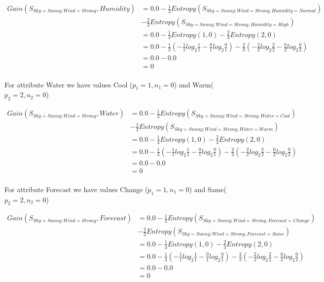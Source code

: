 \documentclass[10pt,a4paper]{article}
\begin{document}
{{{{{{{{{{\begin{equation}
\begin{split}
Gain(S_{Sky=Sunny;Wind=Strong},Humidity) &= 0.0 - \frac{1}{3} Entropy(S_{Sky=Sunny;Wind=Strong,Humidity=Normal} ) \\ &- \frac{2}{3}Entropy(S_{Sky=Sunny;Wind=Strong,Humidity=High}) \\
          &= 0.0 - \frac{1}{3} Entropy(1,0) - \frac{2}{3}Entropy(2,0) \\
          &= 0.0 -\frac{1}{3} ( -\frac{1}{1} log_2\frac{1}{1} -\frac{0}{1} log_2\frac{0}{1} ) - \frac{2}{3}(-\frac{2}{2} log_2\frac{2}{2} - \frac{0}{2}log_2\frac{0}{2} ) \\
          &= 0.0 - 0.0\\
          &= 0 \\
\end{split}
\end{equation}

For attribute Water we have values Cool ($p_1=1,n_1=0$) and Warm($p_2=2,n_2=0$)

\begin{equation}
\begin{split}
Gain(S_{Sky=Sunny;Wind=Strong},Water) &= 0.0 - \frac{1}{3} Entropy(S_{Sky=Sunny;Wind=Strong,Water=Cool} ) \\  &- \frac{2}{3}Entropy(S_{Sky=Sunny;Wind=Strong,Water=Warm}) \\
          &= 0.0 - \frac{1}{3} Entropy(1,0) - \frac{2}{3}Entropy(2,0) \\
          &= 0.0 -\frac{1}{3} ( -\frac{1}{1} log_2\frac{1}{1} -\frac{0}{1} log_2\frac{0}{1} ) - \frac{2}{3}(-\frac{2}{2} log_2\frac{2}{2} - \frac{0}{2}log_2\frac{0}{2} ) \\
          &= 0.0 - 0.0\\
          &= 0 \\
\end{split}
\end{equation}

For attribute Forecast we have values Change ($p_1=1,n_1=0$) and Same($p_2=2,n_2=0$)

\begin{equation}
\begin{split}
Gain(S_{Sky=Sunny;Wind=Strong},Forecast) &= 0.0 - \frac{1}{3} Entropy(S_{Sky=Sunny;Wind=Strong,Forecast=Change} ) \\  &- \frac{2}{3}Entropy(S_{Sky=Sunny;Wind=Strong,Forecast=Same}) \\
          &= 0.0 - \frac{1}{3} Entropy(1,0) - \frac{2}{3}Entropy(2,0) \\
          &= 0.0 -\frac{1}{3} ( -\frac{1}{1} log_2\frac{1}{1} -\frac{0}{1} log_2\frac{0}{1} ) - \frac{2}{3}(-\frac{2}{2} log_2\frac{2}{2} - \frac{0}{2}log_2\frac{0}{2} ) \\
          &= 0.0 - 0.0\\
          &= 0 \\
\end{split}
\end{equation}

}}}}}}}}}}
\end{document}
